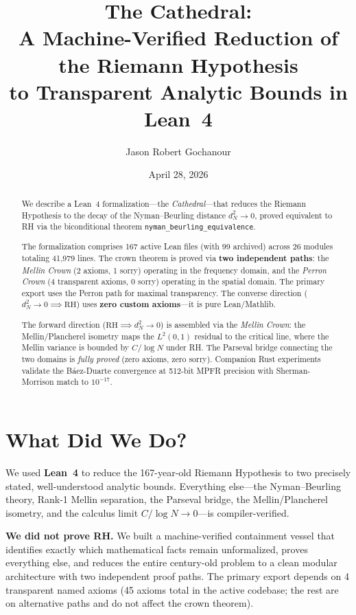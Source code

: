 \documentclass[12pt,a4paper]{article}
\title{%
  The Cathedral:\\[4pt]
  \large A Machine-Verified Reduction of the Riemann Hypothesis\\[2pt]
  \large to Transparent Analytic Bounds in Lean~4%
}
\author{Jason Robert Gochanour}
\date{April 28, 2026}
\begin{document}
\maketitle

\begin{abstract}
We describe a Lean~4 formalization---the \emph{Cathedral}---that reduces
the Riemann Hypothesis to the decay of the Nyman--Beurling distance
$d_N^2 \to 0$, proved equivalent to RH via the biconditional theorem
\texttt{nyman\_beurling\_equivalence}.

The formalization comprises 167 active Lean files
(with 99 archived) across 26 modules totaling 41{,}979 lines.
The crown theorem is proved via \textbf{two independent paths}:
the \emph{Mellin Crown} (2 axioms, 1 sorry) operating in the
frequency domain, and the \emph{Perron Crown} (4 transparent axioms,
0 sorry) operating in the spatial domain. The primary export uses
the Perron path for maximal transparency.
The converse direction ($d_N^2 \to 0 \implies \mathrm{RH}$) uses
\textbf{zero custom axioms}---it is pure Lean/Mathlib.

The forward direction ($\mathrm{RH} \implies d_N^2 \to 0$) is assembled
via the \emph{Mellin Crown}: the Mellin/Plancherel isometry maps the
$L^2(0,1)$ residual to the critical line, where the Mellin variance is
bounded by $C/\log N$ under RH. The Parseval bridge connecting the two
domains is \emph{fully proved} (zero axioms, zero sorry).
Companion Rust experiments validate the B\'aez-Duarte convergence
at 512-bit MPFR precision with Sherman-Morrison match to $10^{-17}$.
\end{abstract}

\section{What Did We Do?}

We used \textbf{Lean~4} to reduce the 167-year-old Riemann Hypothesis
to two precisely stated, well-understood analytic bounds. Everything
else---the Nyman--Beurling theory,
Rank-1 Mellin separation, the Parseval bridge, the Mellin/Plancherel
isometry, and the calculus limit $C/\log N \to 0$---is compiler-verified.

\textbf{We did not prove RH.} We built a machine-verified containment
vessel that identifies exactly which mathematical facts remain unformalized,
proves everything else, and reduces the entire century-old problem to
a clean modular architecture with two independent proof paths.
The primary export depends on 4 transparent named axioms
(45 axioms total in the active codebase;
the rest are on alternative paths and do not affect the crown theorem).
\end{document}
